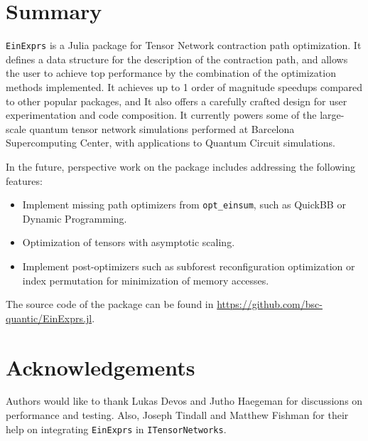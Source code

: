 \documentclass{juliacon}
\begin{document}
\section{Summary}

\texttt{EinExprs} is a Julia package for Tensor Network contraction path optimization. It defines a data structure for the description of the contraction path, and allows the user to achieve top performance by the combination of the optimization methods implemented. It achieves up to 1 order of magnitude speedups compared to other popular packages, and It also offers a carefully crafted design for user experimentation and code composition. It currently powers some of the large-scale quantum tensor network simulations performed at Barcelona Supercomputing Center, with applications to Quantum Circuit simulations.

In the future, perspective work on the package includes addressing the following features:
\begin{itemize}
    \item Implement missing path optimizers from \texttt{opt\_einsum}, such as QuickBB or Dynamic Programming.
    \item Optimization of tensors with asymptotic scaling.
    \item Implement post-optimizers such as subforest reconfiguration optimization or index permutation for minimization of memory accesses.
\end{itemize}

The source code of the package can be found in \url{https://github.com/bsc-quantic/EinExprs.jl}.

\section{Acknowledgements}

Authors would like to thank Lukas Devos and Jutho Haegeman for discussions on performance and testing. Also, Joseph Tindall and Matthew Fishman for their help on integrating \texttt{EinExprs} in \texttt{ITensorNetworks}.


\end{document}
